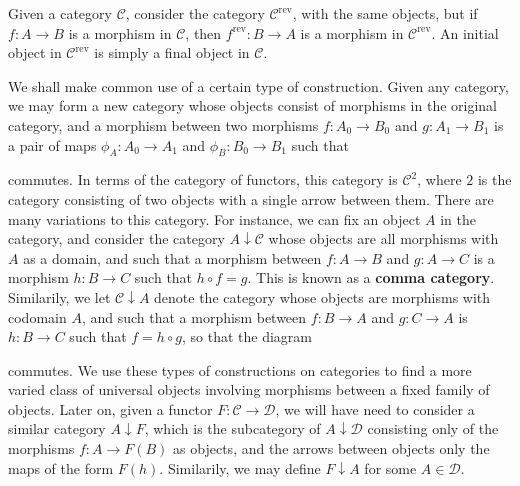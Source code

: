 \begin{example}
    Given a category $\mathcal{C}$, consider the category $\mathcal{C}^{\text{rev}}$, with the same objects, but if $f: A \to B$ is a morphism in $\mathcal{C}$, then $f^{\text{rev}}: B \to A$ is a morphism in $\mathcal{C}^{\text{rev}}$. An initial object in $\mathcal{C}^{\text{rev}}$ is simply a final object in $\mathcal{C}$.
\end{example}

We shall make common use of a certain type of construction. Given any category, we may form a new category whose objects consist of morphisms in the original category, and a morphism between two morphisms $f: A_0 \to B_0$ and $g: A_1 \to B_1$ is a pair of maps $\phi_A: A_0 \to A_1$ and $\phi_B: B_0 \to B_1$ such that
%
\begin{center}
\end{center}
%
commutes. In terms of the category of functors, this category is $\mathcal{C}^2$, where $2$ is the category consisting of two objects with a single arrow between them. There are many variations to this category. For instance, we can fix an object $A$ in the category, and consider the category $A \downarrow \mathcal{C}$ whose objects are all morphisms with $A$ as a domain, and such that a morphism between $f: A \to B$ and $g: A \to C$ is a morphism $h: B \to C$ such that $h \circ f = g$. This is known as a {\bf comma category}. Similarily, we let $\mathcal{C} \downarrow A$ denote the category whose objects are morphisms with codomain $A$, and such that a morphism between $f: B \to A$ and $g: C \to A$ is $h: B \to C$ such that $f = h \circ g$, so that the diagram
%
\begin{center}
\end{center}
%
commutes. We use these types of constructions on categories to find a more varied class of universal objects involving morphisms between a fixed family of objects. Later on, given a functor $F: \mathcal{C} \to \mathcal{D}$, we will have need to consider a similar category $A \downarrow F$, which is the subcategory of $A \downarrow \mathcal{D}$ consisting only of the morphisms $f: A \to F(B)$ as objects, and the arrows between objects only the maps of the form $F(h)$. Similarily, we may define $F \downarrow A$ for some $A \in \mathcal{D}$.

